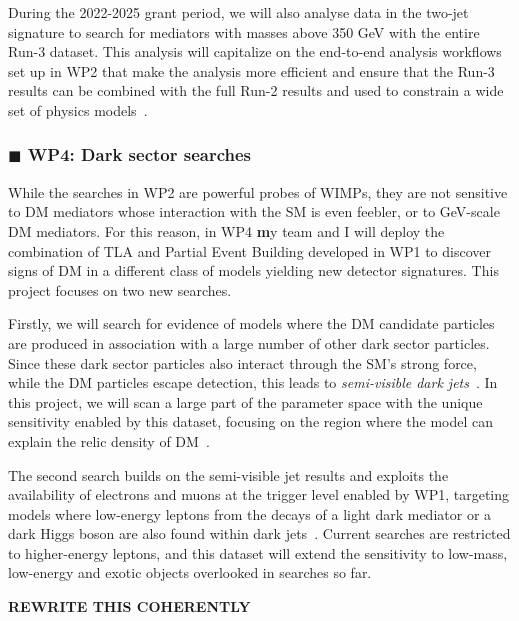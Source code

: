 \documentclass[11pt,a4paper]{article}
\begin{document}
During the 2022-2025 grant period, we will also analyse data in the two-jet signature to search for mediators with masses above 350 GeV with the entire Run-3 dataset. 
This analysis will capitalize on the end-to-end analysis workflows set up in WP2 that make the analysis more efficient and ensure that the Run-3 results can be combined with the full Run-2 results and used to constrain a wide set of physics models~\cite{Kim:2019rhy}.   

\subsubsection*{\color{orange} $\blacksquare$ \color{black} WP4: Dark sector searches}

While the searches in WP2 are powerful probes of WIMPs, they are not sensitive to DM mediators whose interaction with the SM is even feebler, or to GeV-scale DM mediators. 
For this reason, in WP4 \textbf
my team and I will deploy the {combination of TLA and Partial Event Building} developed in WP1 to {discover signs of DM in a different class of models yielding new detector signatures}. 
This project focuses on two new searches.  

Firstly, we will search for evidence of models where the DM candidate particles are produced in association with a large number of other dark sector particles. 
Since these dark sector particles also interact through the SM's strong force, while the DM particles escape detection, this leads to \textit{semi-visible dark jets}~\cite{Cohen:2017pzm}.
In this project, we will scan a large part of the parameter space with the unique sensitivity enabled by this dataset, focusing on the region where the model can explain the relic density of DM~\cite{Bernreuther:2019pfb}. 

The second search builds on the semi-visible jet results and exploits the availability of electrons and muons at the trigger level enabled by WP1, targeting models where low-energy leptons from the decays of a light dark mediator or a dark Higgs boson are also found within dark jets~\cite{Curtin:2014cca,Falkowski:2010gv}. %
Current searches are restricted to higher-energy leptons, and this dataset will extend the sensitivity to low-mass, low-energy and exotic objects overlooked in searches so far. 

\textbf{REWRITE THIS COHERENTLY}
\end{document}
